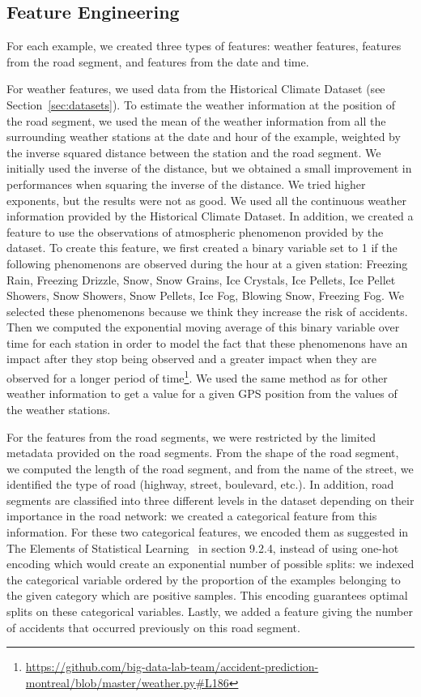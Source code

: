 \documentclass[conference]{IEEEtran}
\begin{document}
\subsection{Feature Engineering}

For each example, we created three types of features: weather features,
features from the road segment, and features from the date and time.

For weather features, we used data from the Historical Climate Dataset (see Section~\ref{sec:datasets}).
To estimate the weather information at the position of the road
segment, we used the mean of the weather information from all the
surrounding weather stations at the date and hour of the example, weighted
by the inverse squared distance between the station and the
road segment. We initially used the inverse of the distance, but we
obtained a small improvement in performances when squaring the inverse of
the distance. We tried higher exponents, but the results were not as good.
We used all the continuous weather information provided
by the Historical Climate Dataset. In addition, we created a feature to use
the observations of atmospheric phenomenon provided by the dataset.
To create this feature, we first created a binary variable set to 1 if the
following phenomenons are observed during the hour at a given station:
Freezing Rain, Freezing Drizzle, Snow, Snow Grains, Ice Crystals, Ice Pellets,
Ice Pellet Showers, Snow Showers, Snow Pellets, Ice Fog, Blowing Snow, Freezing
Fog. We selected these phenomenons because we think they increase the risk of
accidents. Then we computed the exponential moving average of this binary
variable over time for each station in order to model the fact that
these phenomenons have an impact after they stop being observed and a greater
impact when they are observed for a longer period of time\footnote{\url{https://github.com/big-data-lab-team/accident-prediction-montreal/blob/master/weather.py\#L186}}.
We used the same method as for other weather information to get a value for a given 
GPS position from the values of the weather stations.

For the features from the road segments, we were restricted by the limited
metadata provided on the road segments. From the shape of the road segment,
we computed the length of the road segment, and from the name of the
street, we identified the type of road (highway, street, boulevard, etc.).
In addition, road segments are classified into three different levels in
the dataset depending on their importance in the road network: we created a
categorical feature from this information. For these two categorical
features, we encoded them as suggested in The Elements of Statistical
Learning~\cite{elementsofstat} in section 9.2.4, instead of using one-hot
encoding which would create an exponential number of possible splits: we indexed the
categorical variable ordered by the proportion of the examples belonging to
the given category which are positive samples. This encoding guarantees 
optimal splits on these categorical variables. Lastly, we added a
feature giving the number of accidents that occurred previously on this
road segment.
\end{document}
